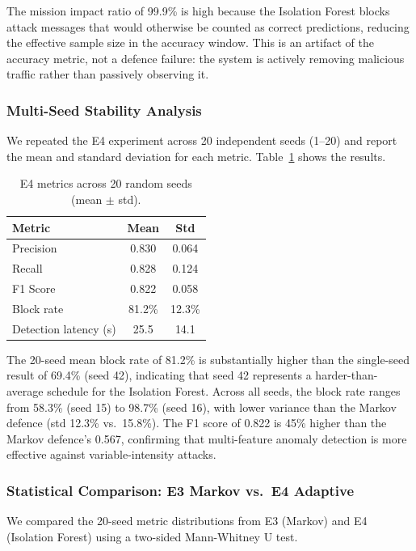 The mission impact ratio of 99.9\% is high because the Isolation Forest blocks attack messages that would otherwise be counted as correct predictions, reducing the effective sample size in the accuracy window.
This is an artifact of the accuracy metric, not a defence failure: the system is actively removing malicious traffic rather than passively observing it.

\subsubsection{Multi-Seed Stability Analysis}

We repeated the E4 experiment across 20 independent seeds (1--20) and report the mean and standard deviation for each metric.
Table~\ref{tab:e4_multiseed} shows the results.

\begin{table}[t]
\centering
\caption{E4 metrics across 20 random seeds (mean $\pm$ std).}
\label{tab:e4_multiseed}
\renewcommand{\arraystretch}{1.15}
\begin{tabular}{lcc}
\toprule
\textbf{Metric} & \textbf{Mean} & \textbf{Std} \\
\midrule
Precision & 0.830 & 0.064 \\
Recall & 0.828 & 0.124 \\
F1 Score & 0.822 & 0.058 \\
Block rate & 81.2\% & 12.3\% \\
Detection latency (s) & 25.5 & 14.1 \\
\bottomrule
\end{tabular}
\end{table}

The 20-seed mean block rate of 81.2\% is substantially higher than the single-seed result of 69.4\% (seed 42), indicating that seed 42 represents a harder-than-average schedule for the Isolation Forest.
Across all seeds, the block rate ranges from 58.3\% (seed 15) to 98.7\% (seed 16), with lower variance than the Markov defence (std 12.3\% vs.\ 15.8\%).
The F1 score of 0.822 is 45\% higher than the Markov defence's 0.567, confirming that multi-feature anomaly detection is more effective against variable-intensity attacks.

\subsubsection{Statistical Comparison: E3 Markov vs.\ E4 Adaptive}

We compared the 20-seed metric distributions from E3 (Markov) and E4 (Isolation Forest) using a two-sided Mann-Whitney U test.

